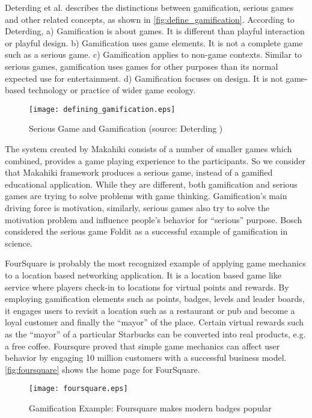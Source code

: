 Deterding et al. \cite{Deterding2011mt} describes the distinctions between gamification, serious games and other related concepts, as shown in \autoref{fig:define_gamification}. According to Deterding, a) Gamification is about games. It is different than playful interaction or playful design. b) Gamification uses game elements. It is not a complete game such as a serious game. c) Gamification applies to non-game contexts. Similar to serious games, gamification uses games for other purposes than its normal expected use for entertainment. d) Gamification focuses on design. It is not game-based technology or practice of wider game ecology.

\begin{figure}[ht!]
	\centering
		\texttt{[image: defining\_gamification.eps]}
		\caption{Serious Game and Gamification (source: Deterding \cite{Deterding2011mt})}
		\label{fig:define_gamification}
\end{figure}

The system created by Makahiki consists of a number of smaller games which combined,  provides a game playing experience to the participants. So we consider that Makahiki framework produces a serious game, instead of a gamified educational application. While they are different, both gamification and serious games are trying to solve problems with game thinking. Gamification's main driving force is motivation, similarly, serious games also try to solve the motivation problem and influence people's behavior for ``serious'' purpose.  Bosch \cite{bosch2011} considered the serious game Foldit as a successful example of gamification in science. 

FourSquare \cite{foursquare} is probably the most recognized example of applying game mechanics to a location based networking application. It is a location based game like service where players check-in to locations for virtual points and rewards.  By employing gamification elements such as points, badges, levels and leader boards, it engages users to revisit a location such as a restaurant or pub and become a loyal customer and finally the ``mayor'' of the place. Certain virtual rewards such as the ``mayor'' of a particular Starbucks can be converted into real products, e.g. a free coffee. Foursqure proved that simple game mechanics can affect user behavior by engaging 10 million customers with a successful business model. \autoref{fig:foursquare} shows the home page for FourSquare.

\begin{figure}[ht!]
	\centering
		\texttt{[image: foursquare.eps]}
		\caption{Gamification Example: Foursquare makes modern badges popular\cite{foursquare}}
		\label{fig:foursquare}
\end{figure}

